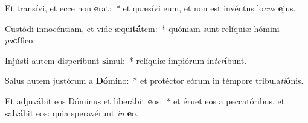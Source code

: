 \item Et transívi, et ecce non \textbf{e}rat:~* et quæsívi eum, et non est invéntus lo\textit{cus} \textbf{e}jus.
\item Custódi innocéntiam, et vide æqui\textbf{tá}tem:~* quóniam sunt relíquiæ hómini \textit{pa}\textbf{cí}fico.
\item Injústi autem disperíbunt \textbf{si}mul:~* relíquiæ impiórum in\textit{ter}\textbf{í}bunt.
\item Salus autem justórum a \textbf{Dó}mino:~* et protéctor eórum in témpore tribula\textit{ti}\textbf{ó}nis.
\item Et adjuvábit eos Dóminus et liberábit \textbf{e}os:~* et éruet eos a peccatóribus, et salvábit eos: quia speravérunt \textit{in} \textbf{e}o.

